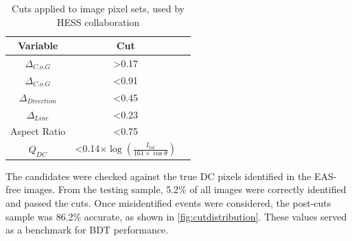 \documentclass{article}
\begin{document}
\begin{table}[h!]
  \centering
  \caption{Cuts applied to image pixel sets, used by HESS collaboration \cite{hess07}}
  \label{tab:table1}
  \begin{tabular}{ccc}
    \toprule
    Variable & Cut\\
    \midrule
     $ \Delta_{C.o.G}$ & \textgreater 0.17 \\
     $ \Delta_{C.o.G}$ & \textless 0.91 \\
     $\Delta_{Direction}$ & \textless 0.45 \\
     $\Delta_{Line}$ & \textless 0.23 \\
     Aspect Ratio & \textless 0.75 \\
     $Q_{DC}$ & \textless 0.14$ \times \log(\frac{I_{tot}}{161 \times \cos \theta})$ \\
    \bottomrule
  \end{tabular}
\end{table}

The candidates were checked against the true DC pixels identified in the EAS-free images. From the testing sample, 5.2\% of all images were correctly identified and passed the cuts. Once misidentified events were considered, the post-cuts sample was 86.2\% accurate, as shown in \ref{fig:cutdistribution}. These values served as a benchmark for BDT performance.
\end{document}
